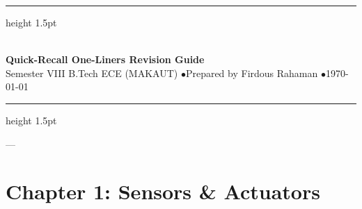 \documentclass[11pt,a4paper]{article}
\begin{document}
\begin{center}
  \vspace*{-0.3in}
  {\hrule height 1.5pt} \vspace{0.25cm}
  {\Huge\bfseries\color{darkblue}} \\[0.2cm]
  {\Large\bfseries\color{secondary}\sffamily Quick-Recall One-Liners Revision Guide} \\[0.25cm]
  {\small\sffamily\color{secondary} Semester VIII B.Tech ECE (MAKAUT) \quad$\bullet$\quad Prepared by Firdous Rahaman \quad$\bullet$\quad \today} \\[0.2cm]
  {\hrule height 1.5pt}
  \vspace{1.0em}
\end{center}
\thispagestyle{plain}


---

\section*{Chapter 1: Sensors \& Actuators}
\end{document}
